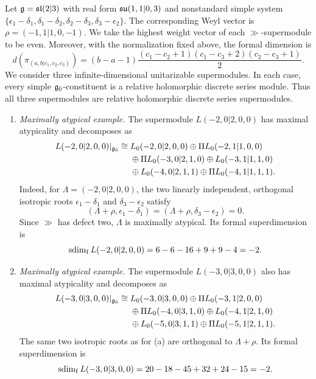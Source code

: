 \begin{example}\label{ex::sl23_formal_superdimension}
Let $\gg=\sl(2\vert3)$ with real form $\su(1,1\vert0,3)$ and
nonstandard simple system
$
\{\epsilon_1-\delta_1,\delta_1-\delta_2,
  \delta_2-\delta_3,\delta_3-\epsilon_2\}.
$
The corresponding Weyl vector is $\rho=(-1,1\vert1,0,-1)$.
We take the highest weight vector of each $\gg$-supermodule to be even. Moreover, with the
normalization fixed above, the formal dimension is
\[
d(\pi_{(a,b\vert c_1,c_2,c_3)})
=(b-a-1)
\frac{(c_1-c_2+1)(c_1-c_3+2)(c_2-c_3+1)}{2}.
\]
We consider three infinite-dimensional unitarizable supermodules.
In each case, every simple $\even$-constituent is a relative holomorphic
discrete series module. Thus all three supermodules are relative
holomorphic discrete series supermodules.

\begin{enumerate}
\item[(a)] \emph{Maximally atypical example.}
The supermodule $L(-2,0\vert2,0,0)$ has maximal atypicality and
decomposes as
\[
\begin{aligned}
L(-2,0\vert2,0,0)\vert_{\even}
\cong{}&L_0(-2,0\vert2,0,0)
\oplus\Pi L_0(-2,1\vert1,0,0)\\
&\oplus\Pi L_0(-3,0\vert2,1,0)
\oplus L_0(-3,1\vert1,1,0)\\
&\oplus L_0(-4,0\vert2,1,1)
\oplus\Pi L_0(-4,1\vert1,1,1).
\end{aligned}
\]
Indeed, for $\Lambda=(-2,0\vert2,0,0)$, the two linearly independent,
orthogonal isotropic roots $\epsilon_1-\delta_1$ and
$\delta_3-\epsilon_2$ satisfy
\[
(\Lambda+\rho,\epsilon_1-\delta_1)
=(\Lambda+\rho,\delta_3-\epsilon_2)=0.
\]
Since $\gg$ has defect two, $\Lambda$ is maximally atypical.
Its formal superdimension is
\[
\fsdim L(-2,0\vert2,0,0)=6-6-16+9+9-4=-2.
\]

\item[(b)] \emph{Maximally atypical example.}
The supermodule $L(-3,0\vert3,0,0)$ also has maximal atypicality and
decomposes as
\[
\begin{aligned}
L(-3,0\vert3,0,0)\vert_{\even}
\cong{}&L_0(-3,0\vert3,0,0)
\oplus\Pi L_0(-3,1\vert2,0,0)\\
&\oplus\Pi L_0(-4,0\vert3,1,0)
\oplus L_0(-4,1\vert2,1,0)\\
&\oplus L_0(-5,0\vert3,1,1)
\oplus\Pi L_0(-5,1\vert2,1,1).
\end{aligned}
\]
The same two isotropic roots as for (a) are orthogonal to $\Lambda+\rho$.
Its formal superdimension is
\[
\fsdim L(-3,0\vert3,0,0)=20-18-45+32+24-15=-2.
\]


\end{enumerate}
\end{example}
